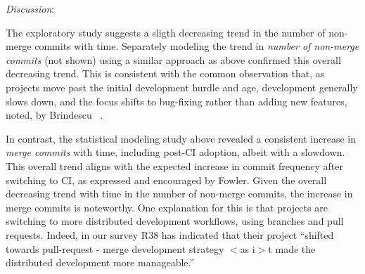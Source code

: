 %

%

\smallskip\noindent \emph{Discussion}:

The exploratory study suggests a sligth decreasing trend in the number 
of non-merge commits with time.
Separately modeling the trend in \emph{number of non-merge commits}
(not shown) using a similar approach as above confirmed this overall 
decreasing trend.
This is consistent with the common observation that, as projects move 
past the initial development hurdle and age, development generally slows 
down, and the focus shifts to bug-fixing rather than adding new features, 
noted, \eg by Brindescu \etal~\cite{brindescu2014centralized}.

In contrast, the statistical modeling study above revealed a consistent 
increase in \emph{merge commits} with time, including post-CI adoption, 
albeit with a slowdown.
This overall trend aligns with the expected increase in commit frequency 
after switching to CI, as expressed and encouraged by Fowler.
Given the overall decreasing trend with time in the number of non-merge
commits, the increase in merge commits is noteworthy.
One explanation for this is that projects are switching to more distributed
development workflows, using branches and pull requests. 
Indeed, in our survey R38 has indicated that their project ``shifted towards 
pull-request - merge development strategy $<$as i$>$t made the distributed development more manageable.''

